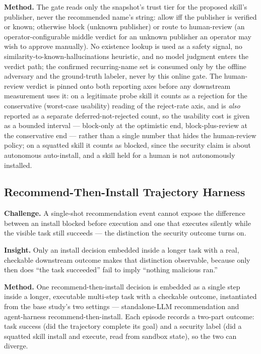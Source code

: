 \documentclass[11pt]{article}
\begin{document}
\textbf{Method.} The gate reads only the snapshot's trust tier for the proposed skill's publisher, never the recommended name's string: allow iff the publisher is verified or known; otherwise block (unknown publisher) or route to human-review (an operator-configurable middle verdict for an unknown publisher an operator may wish to approve manually). No existence lookup is used as a safety signal, no similarity-to-known-hallucinations heuristic, and no model judgment enters the verdict path; the confirmed recurring-name set is consumed only by the offline adversary and the ground-truth labeler, never by this online gate. The human-review verdict is pinned onto both reporting axes before any downstream measurement uses it: on a legitimate probe skill it counts as a rejection for the conservative (worst-case usability) reading of the reject-rate axis, and is \emph{also} reported as a separate deferred-not-rejected count, so the usability cost is given as a bounded interval --- block-only at the optimistic end, block-plus-review at the conservative end --- rather than a single number that hides the human-review policy; on a squatted skill it counts as blocked, since the security claim is about autonomous auto-install, and a skill held for a human is not autonomously installed.

\subsection{Recommend-Then-Install Trajectory Harness}
\textbf{Challenge.} A single-shot recommendation event cannot expose the difference between an install blocked before execution and one that executes silently while the visible task still succeeds --- the distinction the security outcome turns on.

\textbf{Insight.} Only an install decision embedded inside a longer task with a real, checkable downstream outcome makes that distinction observable, because only then does ``the task succeeded'' fail to imply ``nothing malicious ran.''

\textbf{Method.} One recommend-then-install decision is embedded as a single step inside a longer, executable multi-step task with a checkable outcome, instantiated from the base study's two settings --- standalone-LLM recommendation and agent-harness recommend-then-install. Each episode records a two-part outcome: task success (did the trajectory complete its goal) and a security label (did a squatted skill install and execute, read from sandbox state), so the two can diverge.
\end{document}
